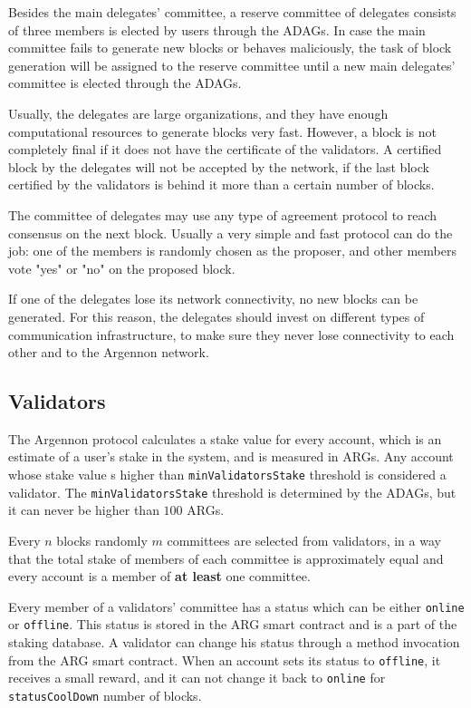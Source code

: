 Besides the main delegates' committee, a reserve committee of delegates consists of three members is elected by users
through the ADAGs. In case the main committee fails to generate new blocks or behaves maliciously, the task of
block generation will be assigned to the reserve committee until a new main delegates' committee is elected
through the ADAGs.

Usually, the delegates are large organizations, and they have enough computational resources to generate blocks
very fast. However, a block is not completely final if it does not have the certificate of the validators.
A certified block by the delegates will not be accepted by the network, if the last block certified by
the validators is behind it more than a certain number of blocks.

The committee of delegates may use any type of agreement protocol to reach consensus on the
next block. Usually a very simple and fast protocol can do the job: one of the members
is randomly chosen as the proposer, and other members vote "yes" or "no" on the proposed block.

If one of the delegates lose its network connectivity, no new blocks can be generated. For this reason,
the delegates should invest on different types of communication infrastructure, to make sure they never lose
connectivity to each other and to the Argennon network.

\subsection{Validators}\label{subsec:validators-committee}

The Argennon protocol calculates a stake value for every account, which is an estimate of a user's stake in the
system, and is measured in ARGs. Any account whose stake value s higher than
\texttt{minValidatorsStake} threshold is considered a validator.
The \texttt{minValidatorsStake}
threshold is determined by the ADAGs, but it can never be higher than $100$ ARGs.

Every $n$ blocks randomly $m$ committees are selected from
validators, in a way that the total stake of members of each committee is approximately equal and every
account is a member of \textbf{at least} one committee.

Every member of a validators' committee has a status which can be either \texttt{online} or \texttt{offline}.
This status is stored in the ARG smart contract and is a part of the staking database. A validator can change
his status through a method invocation
from the ARG smart contract. When an account sets its status to \texttt{offline}, it receives a small reward, and
it can not change it back to \texttt{online} for \texttt{statusCoolDown} number of blocks.

